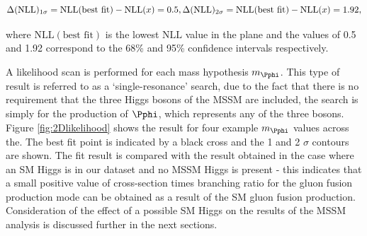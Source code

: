 \begin{equation}
\Delta(\mathrm{NLL})_{1\sigma} = \mathrm{NLL}(\text{best fit}) - \mathrm{NLL}(x) = 0.5 ,\\ 
\Delta(\mathrm{NLL})_{2\sigma} = \mathrm{NLL}(\text{best fit}) - \mathrm{NLL}(x) = 1.92 , 
\end{equation}

where $\mathrm{NLL}(\text{best fit})$ is the lowest $\mathrm{NLL}$ value in the plane and the
values of 0.5 and 1.92 correspond to the 68\% and 95\% confidence intervals
respectively.

A likelihood scan is performed for each mass hypothesis $m_{\Pphi}$. 
This type of result is referred to as a `single-resonance' search,
due to the fact that there is no requirement that the three Higgs bosons of the
\ac{MSSM} are included, the search is simply for the production of $\Pphi$,
which represents any of the three bosons. Figure \ref{fig:2Dlikelihood} shows the 
result for four example $m_{\Pphi}$ values across the. 
The best fit point is indicated by a black cross and the 1 and 2 $\sigma$
contours are shown. The fit result is compared with the result obtained in the
case where an \ac{SM} Higgs is in our dataset and no \ac{MSSM} Higgs is present
- this indicates that a small positive value of cross-section times branching
ratio for the gluon fusion production mode can be obtained as a result of the
\ac{SM} gluon fusion production. Consideration of the effect of a possible
\ac{SM} Higgs on the results of the \ac{MSSM} analysis is discussed further in
the next sections.


